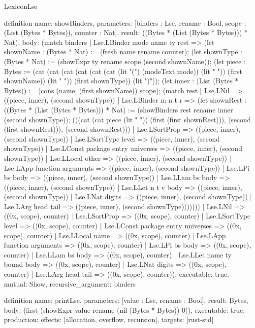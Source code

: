 \begin{lexlean}{LexiconLse}
\begin{semanticmodule}
definition{
  name: showBinders,
  parameters: [binders : Lse, rename : Bool, scope : (List (Bytes * Bytes)), counter : Nat],
  result: ((Bytes * (List (Bytes * Bytes))) * Nat),
  body: (match binders
    | Lse.LBinder mode name ty rest => (let shownName : (Bytes * Nat) := (fresh name rename counter); (let shownType : (Bytes * Nat) := (showExpr ty rename scope (second shownName)); (let piece : Bytes := (cat (cat (cat (cat (cat (cat (lit "(") (modeText mode)) (lit " ")) (first shownName)) (lit " ")) (first shownType)) (lit ")")); (let inner : (List (Bytes * Bytes)) := (cons (name, (first shownName)) scope); (match rest
      | Lse.LNil => ((piece, inner), (second shownType))
      | Lse.LBinder m n t r => (let shownRest : ((Bytes * (List (Bytes * Bytes))) * Nat) := (showBinders rest rename inner (second shownType)); (((cat (cat piece (lit " ")) (first (first shownRest))), (second (first shownRest))), (second shownRest)))
      | Lse.LSortProp => ((piece, inner), (second shownType))
      | Lse.LSortType level => ((piece, inner), (second shownType))
      | Lse.LConst package entry universes => ((piece, inner), (second shownType))
      | Lse.LLocal other => ((piece, inner), (second shownType))
      | Lse.LApp function arguments => ((piece, inner), (second shownType))
      | Lse.LPi bs body => ((piece, inner), (second shownType))
      | Lse.LLam bs body => ((piece, inner), (second shownType))
      | Lse.LLet n t v body => ((piece, inner), (second shownType))
      | Lse.LNat digits => ((piece, inner), (second shownType))
      | Lse.LArg head tail => ((piece, inner), (second shownType)))))))
    | Lse.LNil => ((0x, scope), counter)
    | Lse.LSortProp => ((0x, scope), counter)
    | Lse.LSortType level => ((0x, scope), counter)
    | Lse.LConst package entry universes => ((0x, scope), counter)
    | Lse.LLocal name => ((0x, scope), counter)
    | Lse.LApp function arguments => ((0x, scope), counter)
    | Lse.LPi bs body => ((0x, scope), counter)
    | Lse.LLam bs body => ((0x, scope), counter)
    | Lse.LLet name ty bound body => ((0x, scope), counter)
    | Lse.LNat digits => ((0x, scope), counter)
    | Lse.LArg head tail => ((0x, scope), counter)),
  executable: true,
  mutual: Show,
  recursive_argument: binders
}

definition{
  name: printLse,
  parameters: [value : Lse, rename : Bool],
  result: Bytes,
  body: (first (showExpr value rename (nil (Bytes * Bytes)) 0)),
  executable: true,
  production: {effects: [allocation, overflow, recursion], targets: [rust-std]}
}
\end{semanticmodule}
\end{lexlean}
